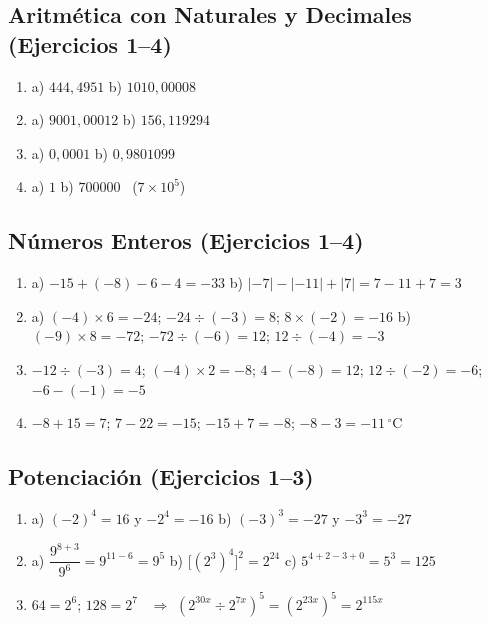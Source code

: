 \documentclass[12pt, letterpaper]{article}
\begin{document}
  \subsection*{Aritmética con Naturales y Decimales (Ejercicios 1--4)}

  \begin{enumerate}[leftmargin=*, label=\textbf{\arabic*.}]
    \item a) $444{,}4951$ \quad b) $1010{,}00008$
    \item a) $9001{,}00012$ \quad b) $156{,}119294$
    \item a) $0{,}0001$ \quad b) $0{,}9801099$
    \item a) $1$ \quad b) $700000$ \ ($7 \times 10^5$)
  \end{enumerate}

  \subsection*{Números Enteros (Ejercicios 1--4)}

  \begin{enumerate}[leftmargin=*, label=\textbf{\arabic*.}]
    \item a) $-15 + (-8) - 6 - 4 = -33$ \quad b) $|-7| - |-11| + |7| = 7 - 11 + 7 = 3$
    \item a) $(-4) \times 6 = -24$; $-24 \div (-3) = 8$; $8 \times (-2) = -16$
          \quad b) $(-9) \times 8 = -72$; $-72 \div (-6) = 12$; $12 \div (-4) = -3$
    \item $-12 \div (-3) = 4$; $(-4) \times 2 = -8$; $4 - (-8) = 12$; $12 \div (-2) = -6$; $-6 - (-1) = -5$
    \item $-8 + 15 = 7$; $7 - 22 = -15$; $-15 + 7 = -8$; $-8 - 3 = -11\,^{\circ}$C
  \end{enumerate}

  \subsection*{Potenciación (Ejercicios 1--3)}

  \begin{enumerate}[leftmargin=*, label=\textbf{\arabic*.}]
    \item a) $(-2)^4 = 16$ y $-2^4 = -16$ \quad b) $(-3)^3 = -27$ y $-3^3 = -27$
    \item a) $\dfrac{9^{8+3}}{9^6} = 9^{11-6} = 9^{5}$ \quad b) $\big[(2^3)^4\big]^2 = 2^{24}$ \quad c) $5^{4+2-3+0} = 5^3 = 125$
    \item $64 = 2^6$; $128 = 2^7$ \ $\Rightarrow$ $(2^{30x} \div 2^{7x})^5 = (2^{23x})^5 = 2^{115x}$
  \end{enumerate}
\end{document}
